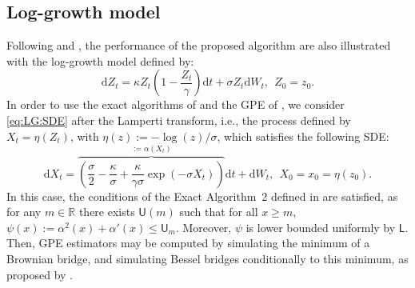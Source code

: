 \documentclass[12pt,draft]{article}
\newcommand{\rmd}{\mathrm{d}}
\newcommand{\1}{\mathrm{1}}
\begin{document}
\subsection*{Log-growth model}
Following \cite{beskos:papaspiliopoulos:roberts:fearnhead:2006} and \cite{olsson:westerborn:2016}, the performance of the proposed algorithm are also illustrated with the log-growth model defined by:
\begin{equation}
\rmd Z_t = \kappa Z_t\left(1-\frac{Z_t}{\gamma}\right)\rmd t + \sigma Z_t \rmd W_t,~~Z_0=z_0. \label{eq:LG:SDE}
\end{equation}
In order to use the exact algorithms of \cite{beskos:papaspiliopoulos:roberts:fearnhead:2006} and the GPE of \cite{fearnhead:papaspiliopoulos:roberts:2008}, we consider  \eqref{eq:LG:SDE} after the Lamperti transform, i.e., the process defined by $X_t=\eta(Z_t)$, with $\eta(z) := -\log (z)/\sigma$,  which satisfies the following SDE:
\begin{equation}
\rmd X_t = \overbrace{\left( \frac{\sigma}{2} -  \frac{\kappa}{\sigma} + \frac{\kappa}{\gamma\sigma}\exp\left(-\sigma X_t\right)\right)}^{:=\alpha(X_t)}\rmd t +\rmd W_t,~~X_0=x_0=\eta(z_0).\label{eq:Lamp:LG}
\end{equation}
In this case, the conditions of the Exact Algorithm~2 defined in \cite{beskos:papaspiliopoulos:roberts:fearnhead:2006} are satisfied, as for any $m \in \mathbb{R}$ there exists $\mathsf{U}(m)$ such that for all $x\ge m$, $\psi(x):=\alpha^2(x)+\alpha'(x) \leq \mathsf{U}_m$. Moreover, $\psi$ is lower bounded uniformly by  $\mathsf{L}$.  Then, GPE estimators may be computed by simulating the minimum of a Brownian bridge, and simulating Bessel bridges conditionally to this minimum, as proposed by \cite{beskos:papaspiliopoulos:roberts:fearnhead:2006}.
\end{document}
